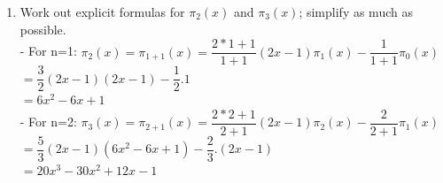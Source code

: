 \documentclass[14pt,a4paper]{article}
\begin{document}
\begin{enumerate}
	\label{3a}
	\item Work out explicit formulas for $\pi_2(x)$ and $\pi_3(x)$; simplify as much as possible.\\
	- For n=1: $\pi_2(x) = \pi_{1+1}(x) = \dfrac{2*1+1}{1+1} (2x-1)\pi_1(x) - \dfrac{1}{1+1}\pi_0(x)$\\ 
	\hspace*{5cm} $ = \dfrac{3}{2}(2x-1)(2x-1) - \dfrac{1}{2}.1$\\
	\hspace*{5cm} $ = 6x^2 - 6x +1$\\
	- For n=2: $\pi_3(x) = \pi_{2+1}(x) = \dfrac{2*2+1}{2+1}(2x-1)\pi_2(x) - \dfrac{2}{2+1}\pi_1(x)$\\ 
	\hspace*{4.9cm} $ = \dfrac{5}{3}(2x-1)(6x^2 -6x+1) - \dfrac{2}{3}.(2x-1)$\\
	\hspace*{4.9cm} $ = 20x^3 -30x^2 + 12x -1$\\
	

\end{enumerate}
\end{document}
